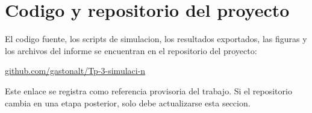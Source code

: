 \section{Codigo y repositorio del proyecto}

El codigo fuente, los scripts de simulacion, los resultados exportados, las figuras y los archivos del informe se encuentran en el repositorio del proyecto:

\begin{center}
\href{https://github.com/gastonalt/Tp-3-simulaci-n}{github.com/gastonalt/Tp-3-simulaci-n}
\end{center}

Este enlace se registra como referencia provisoria del trabajo. Si el repositorio cambia en una etapa posterior, solo debe actualizarse esta seccion.

